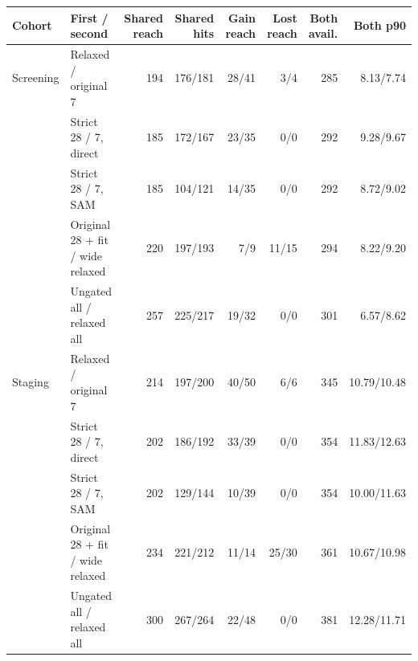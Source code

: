 \begin{tabular}{llrrrrrr}
\toprule
Cohort & First / second & Shared reach & Shared hits & Gain reach & Lost reach & Both avail. & Both p90 \\
\midrule
Screening & Relaxed / original 7 & 194 & 176/181 & 28/41 & 3/4 & 285 & 8.13/7.74 \\
 & Strict 28 / 7, direct & 185 & 172/167 & 23/35 & 0/0 & 292 & 9.28/9.67 \\
 & Strict 28 / 7, SAM & 185 & 104/121 & 14/35 & 0/0 & 292 & 8.72/9.02 \\
 & Original 28 + fit / wide relaxed & 220 & 197/193 & 7/9 & 11/15 & 294 & 8.22/9.20 \\
 & Ungated all / relaxed all & 257 & 225/217 & 19/32 & 0/0 & 301 & 6.57/8.62 \\
\midrule
Staging & Relaxed / original 7 & 214 & 197/200 & 40/50 & 6/6 & 345 & 10.79/10.48 \\
 & Strict 28 / 7, direct & 202 & 186/192 & 33/39 & 0/0 & 354 & 11.83/12.63 \\
 & Strict 28 / 7, SAM & 202 & 129/144 & 10/39 & 0/0 & 354 & 10.00/11.63 \\
 & Original 28 + fit / wide relaxed & 234 & 221/212 & 11/14 & 25/30 & 361 & 10.67/10.98 \\
 & Ungated all / relaxed all & 300 & 267/264 & 22/48 & 0/0 & 381 & 12.28/11.71 \\
\bottomrule
\end{tabular}
